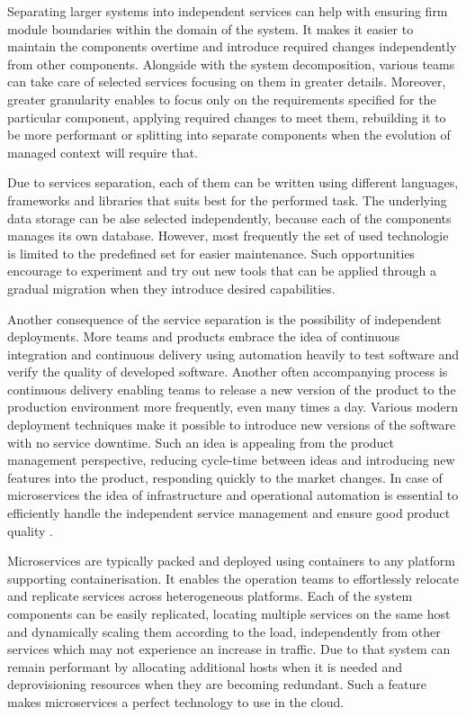 Separating larger systems into independent services can help with ensuring firm module boundaries within the domain of the system. It makes it easier to maintain the components overtime and introduce required changes independently from other components. Alongside with the system decomposition, various teams can take care of selected services focusing on them in greater details. Moreover, greater granularity enables to focus only on the requirements specified for the particular component, applying required changes to meet them, rebuilding it to be more performant or splitting into separate components when the evolution of managed context will require that.

Due to services separation, each of them can be written using different languages, frameworks and libraries that suits best for the performed task. The underlying data storage can be alse selected independently, because each of the components manages its own database. However, most frequently the set of used technologie is limited to the predefined set for easier maintenance. Such opportunities encourage to experiment and try out new tools that can be applied through a gradual migration when they introduce desired capabilities.

Another consequence of the service separation is the possibility of independent deployments. More teams and products embrace the idea of continuous integration and continuous delivery using automation heavily to test software and verify the quality of developed software. Another often accompanying process is continuous delivery enabling teams to release a new version of the product to the production environment more frequently, even many times a day. Various modern deployment techniques make it possible to introduce new versions of the software with no service downtime. Such an idea is appealing from the product management perspective, reducing cycle-time between ideas and introducing new features into the product, responding quickly to the market changes. In case of microservices the idea of infrastructure and operational automation is essential to efficiently handle the independent service management and ensure good product quality \cite{FowlerMicroservicesTradeoffs}.

Microservices are typically packed and deployed using containers to any platform supporting containerisation. It enables the operation teams to effortlessly relocate and replicate services across heterogeneous platforms. Each of the system components can be easily replicated, locating multiple services on the same host and dynamically scaling them according to the load, independently from other services which may not experience an increase in traffic. Due to that system can remain performant by allocating additional hosts when it is needed and deprovisioning resources when they are becoming redundant. Such a feature makes microservices a perfect technology to use in the cloud.

